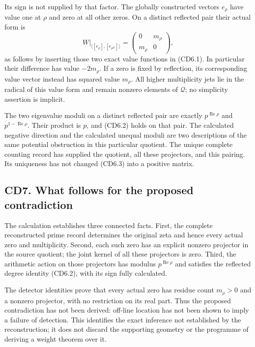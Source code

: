 \documentclass[
]{article}
\begin{document}
Its sign is not supplied by that factor. The globally constructed
vectors \(e_\rho\) have value one at \(\rho\) and zero at all other
zeros. On a distinct reflected pair their actual form is \[
\left.W\right|_{\langle[e_\rho],[e_{\rho^\#}]\rangle}
=\begin{pmatrix}0&m_\rho\\m_\rho&0\end{pmatrix},
\tag{CD6.3}
\] as follows by inserting those two exact value functions in (CD6.1).
In particular their difference has value \(-2m_\rho\). If a zero is
fixed by reflection, its corresponding value vector instead has squared
value \(m_\rho\). All higher multiplicity jets lie in the radical of
this value form and remain nonzero elements of \(\mathcal Q\); no
simplicity assertion is implicit.

The two eigenvalue moduli on a distinct reflected pair are exactly
\(p^{\operatorname{Re}\rho}\) and \(p^{1-\operatorname{Re}\rho}\). Their
product is \(p\), and (CD6.2) holds on that pair. The calculated
negative direction and the calculated unequal moduli are two
descriptions of the same potential obstruction in this particular
quotient. The unique complete counting record has supplied the quotient,
all these projectors, and this pairing. Its uniqueness has not changed
(CD6.3) into a positive matrix.

\subsection{CD7. What follows for the proposed
contradiction}\label{cd7.-what-follows-for-the-proposed-contradiction}

The calculation establishes three connected facts. First, the complete
reconstructed prime record determines the original zeta and hence every
actual zero and multiplicity. Second, each such zero has an explicit
nonzero projector in the source quotient; the joint kernel of all these
projectors is zero. Third, the arithmetic action on those projectors has
modulus \(p^{\operatorname{Re}\rho}\) and satisfies the reflected degree
identity (CD6.2), with its sign fully calculated.

The detector identities prove that every actual zero has residue count
\(m_\rho>0\) and a nonzero projector, with no restriction on its real
part. Thus the proposed contradiction has not been derived: off-line
location has not been shown to imply a failure of detection. This
identifies the exact inference not established by the reconstruction; it
does not discard the supporting geometry or the programme of deriving a
weight theorem over it.
\end{document}

